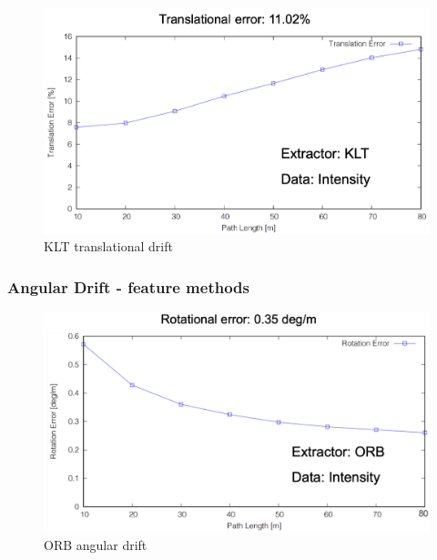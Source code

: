 {{{{                \begin{figure}[!ht]
                    \centering
                    \includegraphics[scale = 0.45]{images/results/mm_drift_translation.png}
                    \caption{KLT translational drift}
                    \label{fig:KLT_drift_transl}
                \end{figure}
                    }
                \clearpage
            \subsubsection{Angular Drift - feature methods}{

                \begin{figure}[!ht]
                    \centering
                    \includegraphics[scale = 0.45]{images/comparison_appendix/orb_drift_angle.png}
                    \caption{ORB angular drift}
                    \label{fig:ORB_drift_angle}
                \end{figure}

}}}}
